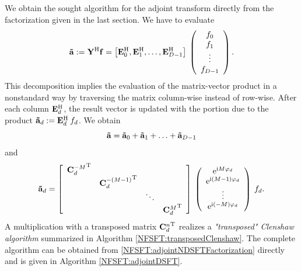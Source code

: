 We obtain the sought algorithm for the adjoint transform directly from the factorization given in the last section. We have to evaluate
\[
  \mathbf{\tilde{a}}
  :=
  \mathbf{Y}^{\text{\rm{H}}} \mathbf{f}
  = 
  \left[
    \mathbf{E}_{0}^{\text{\rm{H}}},
    \mathbf{E}_{1}^{\text{\rm{H}}},
    \ldots,
    \mathbf{E}_{D-1}^{\text{\rm{H}}}
  \right]
  \:
  \left(\begin{array}{c}
    f_{0}\\
    f_{1}\\
    \vdots\\
    f_{D-1}
  \end{array}\right). 
\]
This decomposition implies the evaluation of the matrix-vector product in a nonstandard way by traversing the 
matrix column-wise instead of row-wise. After each column $\mathbf{E}_{d}^{\text{\rm{H}}}$, the result vector is updated with the portion due 
to the product $\mathbf{\tilde{a}}_{d} := \mathbf{E}^{\text{\rm{H}}}_{d} \: f_{d}$. We obtain
\begin{equation}
  \nonumber
  \mathbf{\tilde{a}} = \mathbf{\tilde{a}}_{0} + \mathbf{\tilde{a}}_{1} + \ldots + \mathbf{\tilde{a}}_{D-1}
\end{equation}
and
\begin{equation}
  \label{NFSFT:adjointNDSFTFactorization}
  \mathbf{\tilde{a}}_{d}
  =
  \left[\begin{array}{cccc}
    {\mathbf{C}^{-M}_{d}}^{\text{\rm{T}}} &                               &        &                           \\
                              & {\mathbf{C}^{-(M-1)}_{d}}^{\text{\rm{T}}} &        &                           \\
                              &                                & \ddots &                           \\
                              &                                &        & {\mathbf{C}^{M}_{d}}^{\text{\rm{T}}} 
  \end{array}\right]
  \:
  \left(\begin{array}{c}
    \mbox{\rm{e}}^{\mbox{\scriptsize\rm{i}} M \varphi_{d}}\\
    \mbox{\rm{e}}^{\mbox{\scriptsize\rm{i}} (M-1) \varphi_{d}}\\
    \vdots\\
    \mbox{\rm{e}}^{\mbox{\scriptsize\rm{i}} (-M) \varphi_{d}}
  \end{array}\right)
  \:
  f_{d}.
\end{equation}
A multiplication with a transposed matrix ${\mathbf{C}^{n}_{d}}^{\text{\rm{T}}}$ realizes a \emph{"transposed" Clenshaw algorithm} summarized in Algorithm \ref{NFSFT:transposedClenshaw}. The complete algorithm can be obtained from \eqref{NFSFT:adjointNDSFTFactorization} directly and is given in Algorithm \ref{NFSFT:adjointDSFT}.
